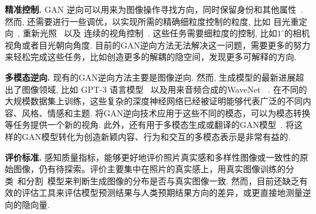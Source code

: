\vspace{1mm}
\noindent\textbf{精准控制.} 
GAN 逆向可以用来为图像操作寻找方向，同时保留身份和其他属性~\cite{abdal2020styleflow,shen2020interpreting}.
然而, 还需要进行一些调优，以实现所需的精确细粒度控制的粒度, 比如 目光重定向~\cite{ganin2016deepwarp,wood2018gaze,he2019gaze,xia2020gaze}, 重新光照~\cite{zhou2019deep,sun2019single,zhang2020portrait} 以及 连续的视角控制~\cite{chen2019monocular}.
这些任务需要细粒度的控制, 比如$1^{\circ}$的相机视角或者目光朝向角度. 
目前的GAN逆向方法无法解决这一问题，需要更多的努力来轻松完成这些任务，比如创造更多的解耦的隐空间，发现更多可解释的方向.

\vspace{1mm}
\noindent\textbf{多模态逆向.}
现有的GAN逆向方法主要是图像逆向.
然而, 生成模型的最新进展超出了图像领域, 比如 GPT-3 语言模型~\cite{brown2020gpt3} 以及用来音频合成的WaveNet ~\cite{oord2016wavenet}. 
在不同的大规模数据集上训练，这些复杂的深度神经网络已经被证明能够代表广泛的不同内容、风格、情感和主题.
将GAN逆向技术应用于这些不同的模态，可以为模态转换等任务提供一个新的视角. 
此外，还有用于多模态生成或翻译的GAN模型~\cite{li2019control,jia2018speaker,prajwal2020speech}. 
将这样的GAN模型转化为创造新颖内容、行为和交互的多模态表示是非常有益的.

\vspace{1mm}
\noindent\textbf{评价标准.}
感知质量指标，能够更好地评价照片真实感和多样性图像或一致性的原始图像，仍有待探索。评价主要集中在照片的真实感上，用真实图像训练的分类~\cite{bau2019seeing}和分割~\cite{voynov2020latent}模型来判断生成图像的分布是否与真实图像一致. 
然而，目前还缺乏有效的评估工具来评估模型预测结果与人类预期结果方向的差异，或更直接地测量逆向的隐向量.